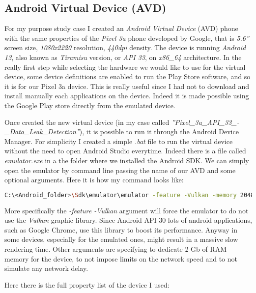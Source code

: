 		\subsection{Android Virtual Device (AVD)}
			For my purpose study case I created an \textit{Android Virtual Device} (AVD) phone with the same properties of the \textit{Pixel 3a} phone developed by Google, that is \textit{5.6''} screen size, \textit{1080x2220} resolution, \textit{440dpi} density. The device is running \textit{Android 13}, also known as \textit{Tiramisu} version, or \textit{API 33}, on \textit{x86\_64} architecture. In the really first step while selecting the hardware we would like to use for the virtual device, some device definitions are enabled to run the Play Store software, and so it is for our Pixel 3a device. This is really useful since I had not to download and install manually each applications on the device. Indeed it is made possible using the Google Play store directly from the emulated device. 
			\par Once created the new virtual device (in my case called \textit{''Pixel\_3a\_API\_33\_-\_Data\_Leak\_Detection''}), it is possible to run it through the Android Device Manager. For simplicity I created a simple \textit{.bat} file to run the virtual device without the need to open Android Studio everytime. Indeed there is a file called \textit{emulator.exe} in a the folder where we installed the Android SDK. We can simply open the emulator by command line passing the name of our AVD and some optional arguments. Here it is how my command looks like:
\begin{lstlisting}[language=bash, caption={run\_AVD.bat}]
	C:\<Android_folder>\Sdk\emulator\emulator -feature -Vulkan -memory 2048 -netdelay none -netspeed full -avd Pixel_3a_API_33_-_Data_Leak_Detection
\end{lstlisting}
		\par More specifically the \textit{-feature -Vulkan} argument will force the emulator to do not use the \textit{Vulkan} graphic library. Since Android API 30 lots of android applications, such as Google Chrome, use this library to boost its performance. Anyway in some devices, especially for the emulated ones, might result in a massive slow rendering time. Other arguments are specifying to dedicate 2 Gb of RAM memory for the device, to not impose limits on the network speed and to not simulate any network delay.
			\par Here there is the full property list of the device I used:
